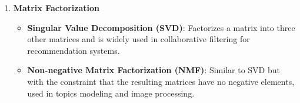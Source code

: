 \begin{enumerate}
    \item \textbf{Matrix Factorization}
    \begin{itemize}
        \item \textbf{Singular Value Decomposition (SVD)}: Factorizes a matrix into three other matrices and is widely used in collaborative filtering for recommendation systems.
        \item \textbf{Non-negative Matrix Factorization (NMF)}: Similar to SVD but with the constraint that the resulting matrices have no negative elements, used in topics modeling and image processing.
    \end{itemize}
\end{enumerate}
